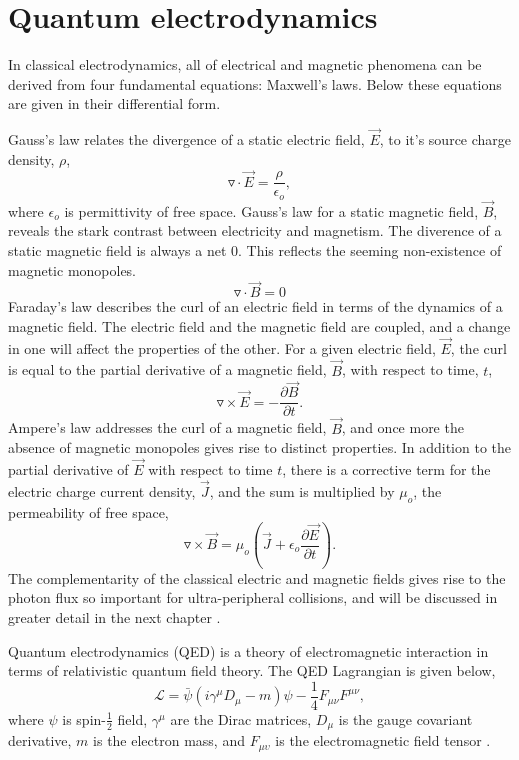 \section{Quantum electrodynamics}

In classical electrodynamics, all of electrical and magnetic phenomena can be derived from four fundamental equations: Maxwell's laws. Below these equations are given in their differential form. 

Gauss's law relates the divergence of a static electric field, $\vec{E}$, to it's source charge density, $\rho$,
\begin{equation}
\triangledown\cdot\vec{E}= \frac{\rho}{\epsilon_o},
\end{equation}
where $\epsilon_o$ is permittivity of free space. Gauss's law for a static magnetic field, $\vec{B}$, reveals the stark contrast between electricity and magnetism. The diverence of a static magnetic field is always a net 0. This reflects the seeming non-existence of magnetic monopoles.  
\begin{equation}
\triangledown\cdot\vec{B}=0
\end{equation}
Faraday's law describes the curl of an electric field in terms of the dynamics of a magnetic field. The electric field and the magnetic field are coupled, and a change in one will affect the properties of the other. For a given electric field, $\vec{E}$, the curl is equal to the partial derivative of a magnetic field, $\vec{B}$, with respect to time, $t$,
\begin{equation}
\triangledown\times\vec{E}=-\frac{\partial\vec{B}}{\partial t}.
\end{equation}
Ampere's law addresses the curl of a magnetic field, $\vec{B}$, and once more the absence of magnetic monopoles gives rise to distinct properties. In addition to the partial derivative of $\vec{E}$ with respect to time $t$, there is a corrective term for the electric charge current density, $\vec{J}$, and the sum is multiplied by $\mu_o$, the permeability of free space,
\begin{equation}
\triangledown \times \vec{B} = \mu_o \left(  \vec{J} + \epsilon _{o} \frac{\partial \vec{E}}{\partial t} \right ).
\end{equation}
The complementarity of the classical electric and magnetic fields gives rise to the photon flux so important for ultra-peripheral collisions, and will be discussed in greater detail in the next chapter \cite{griffiths1999introduction}.

Quantum electrodynamics (QED) is a theory of electromagnetic interaction in terms of relativistic quantum field theory. The QED Lagrangian is given below,
\begin{equation}
{\mathcal {L}}={\bar {\psi }}(i\gamma ^{\mu }D_{\mu }-m)\psi -{\frac {1}{4}}F_{\mu \nu }F^{\mu \nu },
\end{equation} 
where $\psi$ is spin-$\frac{1}{2}$ field, $\gamma^\mu$ are the Dirac matrices, $D_\mu$ is the gauge covariant derivative, $m$ is the electron mass, and $F_{\mu\upsilon}$ is the electromagnetic field tensor \cite{Peskin:1995ev}.

